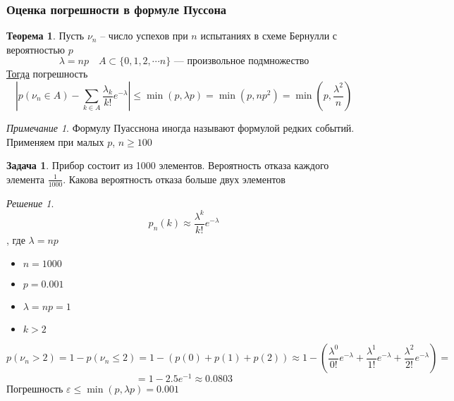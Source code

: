 \documentclass[english]{article}
\theoremstyle{plain}
\theoremstyle{remark}
\newtheorem*{remark}{Примечание}
\newtheorem*{solution}{Решение}
\theoremstyle{definition}
\newtheorem{task}{Задача}
\newtheorem{theorem}{Теорема}[section]
\begin{document}
\subsubsection{Оценка погрешности в формуле Пуссона}
\label{sec:org1e4242d}
\begin{theorem}
Пусть \(\nu_n\) -- число успехов при \(n\) испытаниях в схеме Бернулли с вероятностью \(p\)
\[ \lambda = np\quad A \subset \{0, 1, 2, \dotsm n\}\text{ --- произвольное подмножество}\]
\uline{Тогда} погрешность
\[ \left|p(\nu_n \in A) - \sum_{k \in A} \frac{\lambda_k}{k!} e^{-\lambda}\right| \le \min(p, \lambda p) = \min(p, np^2) = \min\left(p, \frac{\lambda^2}{n}\right) \]
\end{theorem}
\begin{remark}
Формулу Пуасснона иногда называют формулой редких событий. Применяем при малых \(p\), \(n \ge 100\)
\end{remark}
\begin{task}
Прибор состоит из 1000 элементов. Вероятность отказа каждого элемента \(\frac{1}{1000}\). Какова вероятность отказа больше двух элементов
\end{task}
\begin{solution}
\[ p_n(k) \approx \frac{\lambda^k}{k!}e^{-\lambda} \]
, где \(\lambda = np\)
\begin{itemize}
\item \(n = 1000\)
\item \(p = 0.001\)
\item \(\lambda = np = 1\)
\item \(k > 2\)
\end{itemize}
\[ p(\nu_n > 2) = 1 - p(\nu_n \le 2) = 1 - (p(0) + p(1) + p(2)) \approx 1 - \left(\frac{\lambda^0}{0!} e^{-\lambda} + \frac{\lambda^1}{1!}e^{-\lambda} + \frac{\lambda^2}{2!}e^{-\lambda}\right) = \]
\[ = 1 - 2.5e^{-1} \approx 0.0803\]
Погрешность \(\varepsilon \le \min(p, \lambda p) = 0.001\)
\end{solution}
\end{document}
